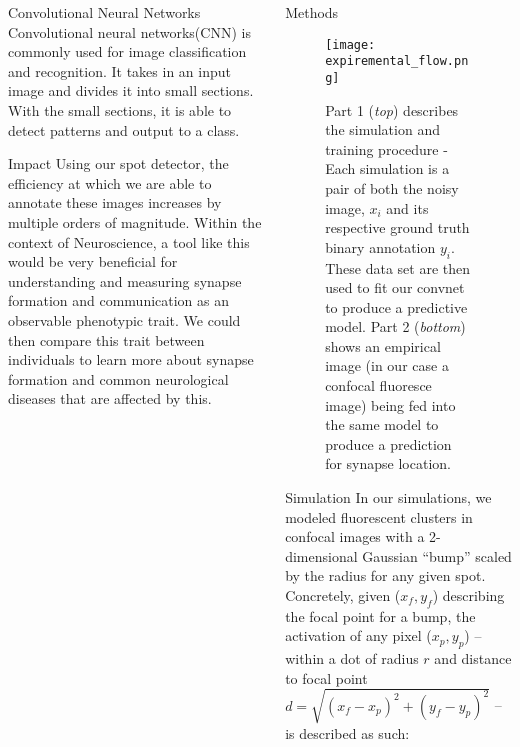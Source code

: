 \documentclass[final]{beamer}
\newlength{\onecolwid}
\begin{document}
\begin{frame}[t]
\begin{columns}[t]
\begin{column}{\onecolwid}
\begin{alertblock}{Convolutional Neural Networks}
Convolutional neural networks(CNN) is commonly used for image classification and recognition. It takes in an input image and divides it into small sections. With the small sections, it is able to detect patterns and output to a class.
\end{alertblock}

\begin{block}{Impact}
 Using our spot detector, the efficiency at which we are able to annotate these images increases by multiple orders of magnitude. Within the context of Neuroscience, a tool like this would be very beneficial for understanding and measuring synapse formation and communication as an observable phenotypic trait. We could then compare this trait between individuals to learn more about synapse formation and common neurological diseases that are affected by this.
\end{block}

% 


\end{column}

\begin{column}{\onecolwid}
\begin{block}{Methods}
    \begin{figure}
        \texttt{[image: expiremental\_flow.png]}
        \setlength{\belowcaptionskip}{-20pt}
        \caption{
        Part 1 (\textit{top}) describes the simulation and training procedure 
        - Each simulation is a pair of both the noisy image, $x_{i}$ and its respective ground truth binary annotation $y_{i}$. These data set are then used to fit our convnet to produce a predictive model. Part 2 (\textit{bottom}) shows an empirical image (in our case a confocal fluoresce image) being fed into the same model to produce a prediction for synapse location.}
    \end{figure}
\end{block}

\begin{block}{Simulation}
In our simulations, we modeled fluorescent clusters in confocal images with a 2-dimensional Gaussian ``bump'' scaled by the radius for any given spot. Concretely, given ($x_{f}, y_{f}$) describing the focal point for a bump, the activation of any pixel ($x_{p}, y_{p}$) -- within a dot of radius $r$ and distance to focal point $d = \sqrt{(x_{f} - x_{p})^{2} + (y_{f} - y_{p})^{2}}$ -- is described as such:


\end{block}
\end{column}
\end{columns}
\end{frame}
\end{document}
